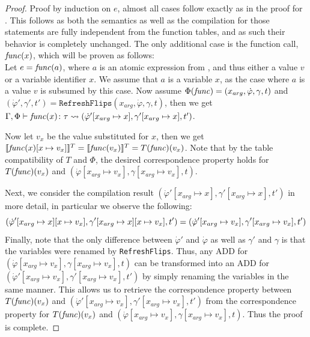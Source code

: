 \begin{proof}
	Proof by induction on $e$, almost all cases follow exactly as in the proof for . 
	This follows as both the semantics as well as the compilation for those statements are fully independent from the function tables, and as such their behavior is completely unchanged.
	The only additional case is the function call, $\mathit{func}(x)$, which will be proven as follows:\\
	
	Let $e = \mathit{func}(a)$, where $a$ is an atomic expression from \AEXP, and thus either a value $v$ or a variable identifier $x$. 
	We assume that $a$ is a variable $x$, as the case where $a$ is a value $v$ is subsumed by this case. 
	Now assume $\Phi(\mathit{func}) = (x_{arg}, \dot{\varphi}, \gamma, t)$ and $(\dot{\varphi}', \gamma', t')= \texttt{RefreshFlips}(x_{arg}, \dot{\varphi}, \gamma, t)$, then we get $\Gamma, \Phi \vdash \mathit{func}(x) \colon \tau \leadsto (\dot{\varphi}'[x_{arg} \mapsto x], \gamma'[x_{arg} \mapsto x], t')$.
	
	Now let $v_x$ be the value substituted for $x$, then we get $\llbracket \mathit{func}(x)[x \mapsto v_x] \rrbracket^T = \llbracket \mathit{func}(v_x)\rrbracket^T = T(\mathit{func})(v_x)$. 
	Note that by the table compatibility of $T$ and $\Phi$, the desired correspondence property holds for $T(\mathit{func})(v_x)$ and $(\dot{\varphi}[x_{arg} \mapsto v_x], \gamma[x_{arg} \mapsto v_x], t)$.
	
	Next, we consider the compilation result $(\dot{\varphi}'[x_{arg} \mapsto x], \gamma'[x_{arg} \mapsto x], t')$ in more detail, in particular we observe the following:
	$$(\dot{\varphi}'[x_{arg} \mapsto x][x\mapsto v_x], \gamma'[x_{arg} \mapsto x][x\mapsto v_x], t') \\
	= (\dot{\varphi}'[x_{arg} \mapsto v_x], \gamma'[x_{arg} \mapsto v_x], t')$$
	Finally, note that the only difference between $\dot{\varphi}'$ and $\dot{\varphi}$ as well as $\gamma'$ and $\gamma$ is that the variables were renamed by \texttt{RefreshFlips}.
	Thus, any ADD for $(\dot{\varphi}[x_{arg} \mapsto v_x], \gamma[x_{arg} \mapsto v_x], t)$ can be transformed into an ADD for $(\dot{\varphi}'[x_{arg} \mapsto v_x], \gamma'[x_{arg} \mapsto v_x], t')$ by simply renaming the variables in the same manner.
	This allows us to retrieve the correspondence property between $T(\mathit{func})(v_x)$ and $(\dot{\varphi}'[x_{arg} \mapsto v_x], \gamma'[x_{arg} \mapsto v_x], t')$ from the correspondence property for $T(\mathit{func})(v_x)$ and $(\dot{\varphi}[x_{arg} \mapsto v_x], \gamma[x_{arg} \mapsto v_x], t)$. 
	Thus the proof is complete.
\end{proof}



